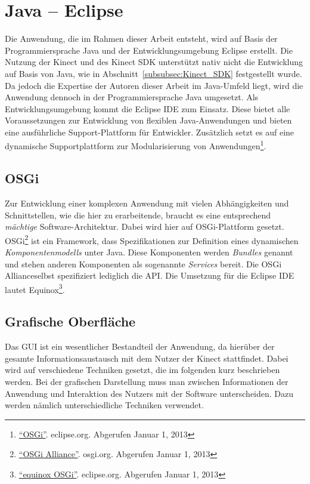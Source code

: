 \section{Java -- Eclipse}
Die Anwendung, die im Rahmen dieser Arbeit entsteht, wird auf Basis der Programmiersprache Java und der Entwicklungsumgebung Eclipse erstellt.
Die Nutzung der Kinect und des Kinect SDK unterst\"utzt nativ nicht die Entwicklung auf Basis von Java, wie in Abschnitt~\ref{subsubsec:Kinect_SDK}
festgestellt wurde. Da jedoch die Expertise der Autoren dieser Arbeit im Java-Umfeld liegt, wird die Anwendung dennoch in der Programmiersprache Java umgesetzt.
\newline
Als Entwicklungsumgebung kommt die \gls{Eclipse} \acrshort{IDE} zum Einsatz. Diese bietet alle Voraussetzungen zur Entwicklung von flexiblen Java-Anwendungen und bieten eine
ausf\"uhrliche Support-Plattform f\"ur Entwickler. Zus\"atzlich setzt es auf eine dynamische Supportplattform zur Modularisierung von Anwendungen\footnote{\href{http://eclipse.org/osgi/}{\enquote{OSGi}}. eclipse.org. Abgerufen Januar 1, 2013}.

\subsection{OSGi}
\label{subsec:OSGi}
Zur Entwicklung einer komplexen Anwendung mit vielen Abh\"angigkeiten und Schnittstellen, wie die hier zu erarbeitende, braucht es eine entsprechend \textit{m\"achtige} Software-Architektur. Dabei wird hier auf OSGi-Plattform gesetzt.
OSGi\footnote{\href{http://www.osgi.org/Technology/HomePage}{\enquote{OSGi Alliance}}. osgi.org. Abgerufen Januar 1, 2013} ist ein \gls{Framework}, dass Spezifikationen zur Definition eines dynamischen \textit{Komponentenmodells} unter Java.
Diese Komponenten werden \textit{Bundles} genannt und stehen anderen Komponenten als sogenannte \textit{Services} bereit.
Die OSGi Alliance\footnotemark[1] selbst spezifiziert lediglich die \gls{API}. Die Umsetzung f\"ur die Eclipse \acrshort{IDE} lautet \gls{Equinox}\footnote{\href{http://eclipse.org/equinox/}{\enquote{equinox OSGi}}. eclipse.org. Abgerufen Januar 1, 2013}.

\subsection{Grafische Oberfl\"ache}
Das \gls{GUI} ist ein wesentlicher Bestandteil der Anwendung, da hier\"uber der gesamte Informationsaustausch mit dem Nutzer der Kinect stattfindet.
Dabei wird auf verschiedene Techniken gesetzt, die im folgenden kurz beschrieben werden.
\newline
Bei der grafischen Darstellung muss man zwischen Informationen der Anwendung und Interaktion des Nutzers mit der Software unterscheiden. Dazu werden n\"amlich unterschiedliche Techniken verwendet.

